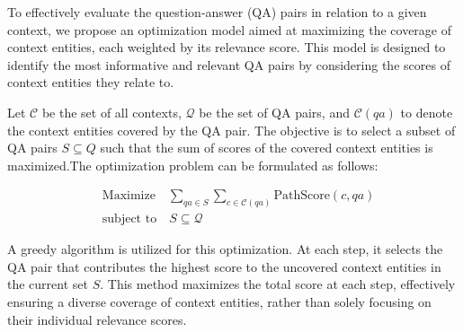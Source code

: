 \documentclass[11pt]{article}
\begin{document}
To effectively evaluate the question-answer (QA) pairs in relation to a given context, we propose an optimization model aimed at maximizing the coverage of context entities, each weighted by its relevance score. This model is designed to identify the most informative and relevant QA pairs by considering the scores of context entities they relate to.

Let \( \mathcal{C} \) be the set of all contexts, $\mathcal{Q}$ be the set of QA pairs, and $\mathcal{C} (qa) $ to denote the context entities covered by the QA pair. The objective is to select a subset of QA pairs \( S \subseteq Q \) such that the sum of scores of the covered context entities is maximized.The optimization problem can be formulated as follows:

\begin{equation}
\begin{aligned}
& \text{Maximize} \quad \sum_{qa \in S} \sum_{c \in \mathcal{C}(qa)} \text{PathScore}(c, qa) \\
& \text{subject to} \quad S \subseteq \mathcal{Q}
\end{aligned}
\end{equation}


A greedy algorithm is utilized for this optimization. At each step, it selects the QA pair that contributes the highest score to the uncovered context entities in the current set \( S \). This method maximizes the total score at each step, effectively ensuring a diverse coverage of context entities, rather than solely focusing on their individual relevance scores.





    
    
\end{document}
